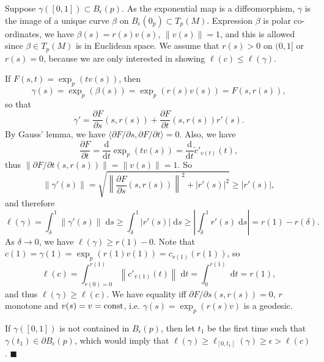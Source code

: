 \documentclass[letter-paper]{tufte-book}
\newenvironment{proof}[1][Proof]{\begin{trivlist}
\item[\hskip \labelsep {\bfseries #1}]}{\end{trivlist}}
\newcommand{\qed}{\hfill$\blacksquare$}
\begin{document}
\begin{proof}
  Suppose $\gamma([0,1]) \subset B_\epsilon(p)$. As the exponential map is a diffeomorphism, $\gamma$ is the image of a unique curve $\beta$ on $B_\epsilon(0_p) \subset T_p(M)$. Expression $\beta$ is polar co-ordinates, we have $\beta(s) = r(s) v(s)$, $\|v(s)\|=1$, and this is allowed since $\beta \in T_p(M)$ is in Euclidean space. We assume that $r(s) > 0$ on $(0,1]$ or $r(s) = 0$, because we are only interested in showing $\ell(c) \leq \ell(\gamma)$.
  
  If $F(s,t) = \exp_p(t v(s))$, then
  \begin{equation*}
    \gamma(s) = \exp_p(\beta(s)) = \exp_p(r(s) v(s)) = F(s, r(s)),
  \end{equation*}
  so that
  \begin{equation*}
    \gamma' = \frac{\partial F}{\partial s}(s, r(s)) + \frac{\partial F}{\partial t}(s, r(s)) r'(s).
  \end{equation*}
  By Gauss' lemma, we have $\langle \partial F / \partial s, \partial F / \partial t \rangle = 0$. Also, we have
  \begin{equation*}
    \frac{\partial F}{\partial t} = \frac{\mathrm{d}}{\mathrm{d}t} \exp_p (t v(s)) = \frac{\mathrm{d}}{\mathrm{d}t} \tilde{c}'_{v(t)}(t),
  \end{equation*}
  thus $\|\partial F / \partial t (s,r(s))\| = \|v(s)\| = 1$. So
  \begin{equation*}
    \|\gamma'(s)\| = \sqrt{ \left\|\frac{\partial F}{\partial s}(s,r(s))\right\|^2 + |r'(s)|^2} \geq |r'(s)|,
  \end{equation*}
  and therefore
  \begin{equation*}
    \ell(\gamma) = \int_\delta^1 \|\gamma'(s)\|\; \mathrm{d}s \geq \int_\delta^1 |r'(s)|\; \mathrm{d}s \geq \left|\int_\delta^1 r'(s)\; \mathrm{d}s\right| = r(1) - r(\delta).
  \end{equation*}
  As $\delta \to 0$, we have $\ell(\gamma) \geq r(1) - 0$. Note that $c(1) = \gamma(1) = \exp_p(r(1) v(1)) = c_{v(1)}(r(1))$, so
  \begin{equation*}
    \ell(c) = \int_{r(0)=0}^{r(1)} \left\|c'_{v(1)}(t) \right\|\; \mathrm{d}t = \int_0^{r(1)} \; \mathrm{d}t = r(1),
  \end{equation*}
  and thus $\ell(\gamma) \geq \ell(c)$. We have equality iff $\partial F / \partial s (s,r(s)) = 0$, $r$ monotone and $v(s) = v = \textnormal{const}$, i.e. $\gamma(s) = \exp_p(r(s)v)$ is a geodesic.
  
  If $\gamma([0,1])$ is not contained in $B_\epsilon(p)$, then let $t_1$ be the first time such that $\gamma(t_1) \in \partial B_\epsilon(p)$, which would imply that $\ell(\gamma) \geq \ell_{[0,t_1]}(\gamma) \geq \epsilon > \ell(c)$. \qed
\end{proof}
\end{document}
